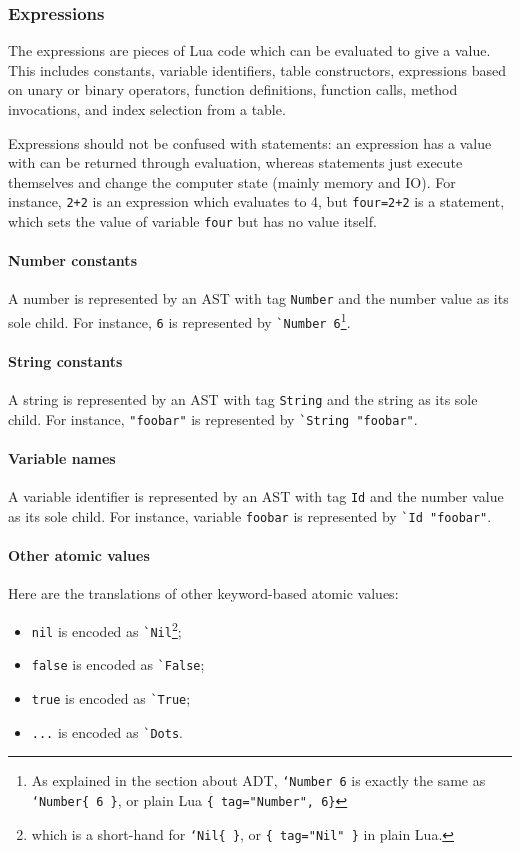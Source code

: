 \subsubsection{Expressions}

The expressions are pieces of Lua code which can be evaluated to give a
value. This includes constants, variable identifiers, table
constructors, expressions based on unary or binary operators, function
definitions, function calls, method invocations, and index selection
from a table.

Expressions should not be confused with statements: an expression has
a value with can be returned through evaluation, whereas statements
just execute themselves and change the computer state (mainly memory
and IO). For instance, \verb|2+2| is an expression which evaluates to
4, but \verb|four=2+2| is a statement, which sets the value of
variable \verb|four| but has no value itself.

\paragraph{Number constants} 
A number is represented by an AST with tag \verb+Number+ and the
number value as its sole child. For instance, \verb+6+ is represented
by \verb+`Number 6+\footnote{As explained in the section about ADT,
  {\tt `Number 6} is exactly the same as {\tt `Number\{ 6 \}}, or
  plain Lua {\tt\{ tag="Number", 6\}} }.

\paragraph{String constants}
A string is represented by an AST with tag \verb+String+ and the
string as its sole child. For instance, \verb+"foobar"+ is
represented by \verb+`String "foobar"+.

\paragraph{Variable names}
A variable identifier is represented by an AST with tag \verb+Id+ and the
number value as its sole child. For instance, variable \verb+foobar+ is
represented by \verb+`Id "foobar"+.

\paragraph{Other atomic values}
Here are the translations of other keyword-based atomic values:
\begin{itemize}
\item \verb+nil+ is encoded as \verb+`Nil+\footnote{which is a
  short-hand for {\tt`Nil\{ \}}, or {\tt\{ tag="Nil" \}} in plain Lua.};
\item \verb+false+ is encoded as \verb+`False+;
\item \verb+true+ is encoded as \verb+`True+;
\item \verb+...+ is encoded as \verb+`Dots+.
\end{itemize}

